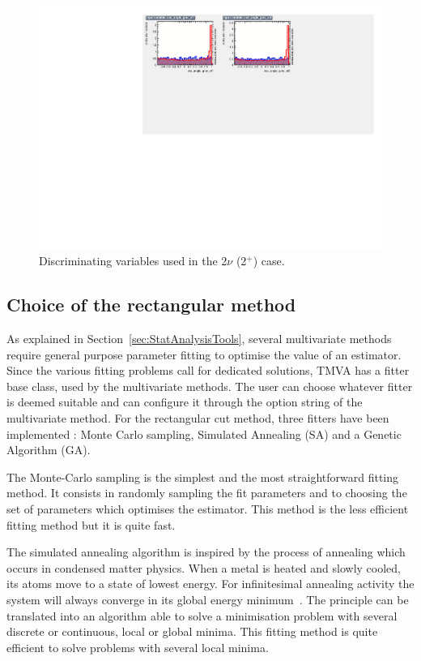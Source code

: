 \documentclass[main.tex]{subfiles}
\begin{document}
\begin{figure} [h!]
\begin{center}
\includegraphics[scale=0.59]{pictures/FinalResults/bb2nu2/150/preselection/variablesBB2nu_2_c.pdf}
\end{center}
\caption{Discriminating variables used in the 2$\nu$ (2$^+$) case.}
\label{Variables14TMVA2nu2}
\end{figure}

\FloatBarrier


\subsection{Choice of the rectangular method}\label{sec:ChoiceRCmethod}


\NI As explained in Section~\ref{sec:StatAnalysisTools}, several multivariate methods require general purpose parameter fitting to optimise the value of an estimator. Since the various fitting problems call for dedicated solutions, TMVA has a fitter base class, used by the multivariate methods. The user can choose whatever fitter is deemed suitable and can configure it through the option string of the multivariate method. For the rectangular cut method, three fitters have been implemented : Monte Carlo sampling, Simulated Annealing (SA) and a Genetic Algorithm (GA).


\bigskip


\NI The Monte-Carlo sampling is the simplest and the most straightforward fitting method. It consists in randomly sampling the fit parameters and to choosing the set of parameters which optimises the estimator. This method is the less efficient fitting method but it is quite fast.


\bigskip


\NI The simulated annealing algorithm is inspired by the process of annealing which occurs in condensed matter physics. When a metal is heated and slowly cooled, its atoms move to a state of lowest energy. For  infinitesimal  annealing  activity  the system  will  always converge in its global energy minimum~\cite{SimulatedAnnealing}. The principle can be translated into an algorithm able to solve a minimisation problem with several discrete or continuous, local or global minima. This fitting method is quite efficient to solve problems with several local minima.
\end{document}
